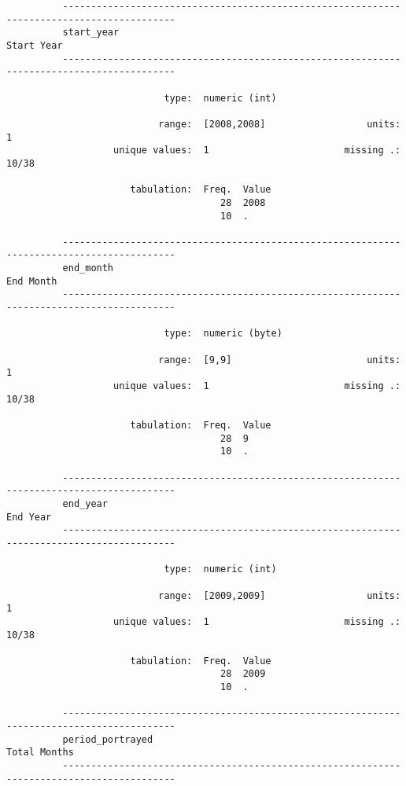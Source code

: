 \documentclass{article}
\begin{document}
\begin{verbatim}
          ------------------------------------------------------------------------------------------
          start_year                                                                      Start Year
          ------------------------------------------------------------------------------------------
          
                            type:  numeric (int)
          
                           range:  [2008,2008]                  units:  1
                   unique values:  1                        missing .:  10/38
          
                      tabulation:  Freq.  Value
                                      28  2008
                                      10  .
          
          ------------------------------------------------------------------------------------------
          end_month                                                                        End Month
          ------------------------------------------------------------------------------------------
          
                            type:  numeric (byte)
          
                           range:  [9,9]                        units:  1
                   unique values:  1                        missing .:  10/38
          
                      tabulation:  Freq.  Value
                                      28  9
                                      10  .
          
          ------------------------------------------------------------------------------------------
          end_year                                                                          End Year
          ------------------------------------------------------------------------------------------
          
                            type:  numeric (int)
          
                           range:  [2009,2009]                  units:  1
                   unique values:  1                        missing .:  10/38
          
                      tabulation:  Freq.  Value
                                      28  2009
                                      10  .
          
          ------------------------------------------------------------------------------------------
          period_portrayed                                                              Total Months
          ------------------------------------------------------------------------------------------
          

\end{verbatim}
\end{document}
